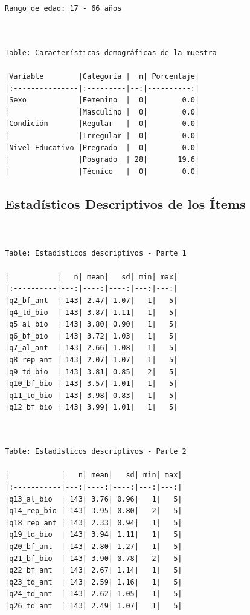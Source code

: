\documentclass[
  11pt,
  letterpaper,
  DIV=11,
  numbers=noendperiod]{scrartcl}
\begin{document}
\begin{verbatim}
Rango de edad: 17 - 66 años
\end{verbatim}

\begin{verbatim}


Table: Características demográficas de la muestra

|Variable        |Categoría |  n| Porcentaje|
|:---------------|:---------|--:|----------:|
|Sexo            |Femenino  |  0|        0.0|
|                |Masculino |  0|        0.0|
|Condición       |Regular   |  0|        0.0|
|                |Irregular |  0|        0.0|
|Nivel Educativo |Pregrado  |  0|        0.0|
|                |Posgrado  | 28|       19.6|
|                |Técnico   |  0|        0.0|
\end{verbatim}

\subsection{Estadísticos Descriptivos de los
Ítems}\label{estaduxedsticos-descriptivos-de-los-uxedtems}

\begin{verbatim}


Table: Estadísticos descriptivos - Parte 1

|           |   n| mean|   sd| min| max|
|:----------|---:|----:|----:|---:|---:|
|q2_bf_ant  | 143| 2.47| 1.07|   1|   5|
|q4_td_bio  | 143| 3.87| 1.11|   1|   5|
|q5_al_bio  | 143| 3.80| 0.90|   1|   5|
|q6_bf_bio  | 143| 3.72| 1.03|   1|   5|
|q7_al_ant  | 143| 2.66| 1.08|   1|   5|
|q8_rep_ant | 143| 2.07| 1.07|   1|   5|
|q9_td_bio  | 143| 3.81| 0.85|   2|   5|
|q10_bf_bio | 143| 3.57| 1.01|   1|   5|
|q11_td_bio | 143| 3.98| 0.83|   1|   5|
|q12_bf_bio | 143| 3.99| 1.01|   1|   5|
\end{verbatim}

\begin{verbatim}


Table: Estadísticos descriptivos - Parte 2

|            |   n| mean|   sd| min| max|
|:-----------|---:|----:|----:|---:|---:|
|q13_al_bio  | 143| 3.76| 0.96|   1|   5|
|q14_rep_bio | 143| 3.95| 0.80|   2|   5|
|q18_rep_ant | 143| 2.33| 0.94|   1|   5|
|q19_td_bio  | 143| 3.94| 1.11|   1|   5|
|q20_bf_ant  | 143| 2.80| 1.27|   1|   5|
|q21_bf_bio  | 143| 3.90| 0.78|   2|   5|
|q22_bf_ant  | 143| 2.67| 1.14|   1|   5|
|q23_td_ant  | 143| 2.59| 1.16|   1|   5|
|q24_td_ant  | 143| 2.62| 1.05|   1|   5|
|q26_td_ant  | 143| 2.49| 1.07|   1|   5|
\end{verbatim}
\end{document}

